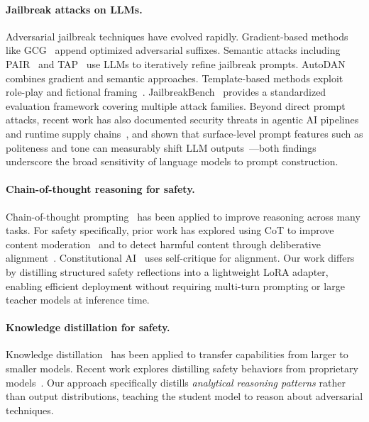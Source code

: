 \documentclass[Superintelligence,article,submit,pdftex,moreauthors]{Definitions/mdpi}
\begin{document}
\paragraph{Jailbreak attacks on LLMs.}
Adversarial jailbreak techniques have evolved rapidly. Gradient-based methods like GCG~\citep{zou2023universal} append optimized adversarial suffixes. Semantic attacks including PAIR~\citep{chao2023jailbreaking} and TAP~\citep{mehrotra2024tree} use LLMs to iteratively refine jailbreak prompts. AutoDAN~\citep{liu2024autodan} combines gradient and semantic approaches. Template-based methods exploit role-play and fictional framing~\citep{wei2024jailbroken, shen2024anything}. JailbreakBench~\citep{chao2024jailbreakbench} provides a standardized evaluation framework covering multiple attack families. Beyond direct prompt attacks, recent work has also documented security threats in agentic AI pipelines and runtime supply chains~\citep{jiang2026agentic}, and shown that surface-level prompt features such as politeness and tone can measurably shift LLM outputs~\citep{cai2025tone}---both findings underscore the broad sensitivity of language models to prompt construction.

\paragraph{Chain-of-thought reasoning for safety.}
Chain-of-thought prompting~\citep{wei2022chain} has been applied to improve reasoning across many tasks. For safety specifically, prior work has explored using CoT to improve content moderation~\citep{wang2024chain} and to detect harmful content through deliberative alignment~\citep{bai2024deliberative}. Constitutional AI~\citep{bai2022constitutional} uses self-critique for alignment. Our work differs by distilling structured safety reflections into a lightweight LoRA adapter, enabling efficient deployment without requiring multi-turn prompting or large teacher models at inference time.

\paragraph{Knowledge distillation for safety.}
Knowledge distillation~\citep{hinton2015distilling} has been applied to transfer capabilities from larger to smaller models. Recent work explores distilling safety behaviors from proprietary models~\citep{tunstall2023zephyr}. Our approach specifically distills \emph{analytical reasoning patterns} rather than output distributions, teaching the student model to reason about adversarial techniques.
\end{document}
